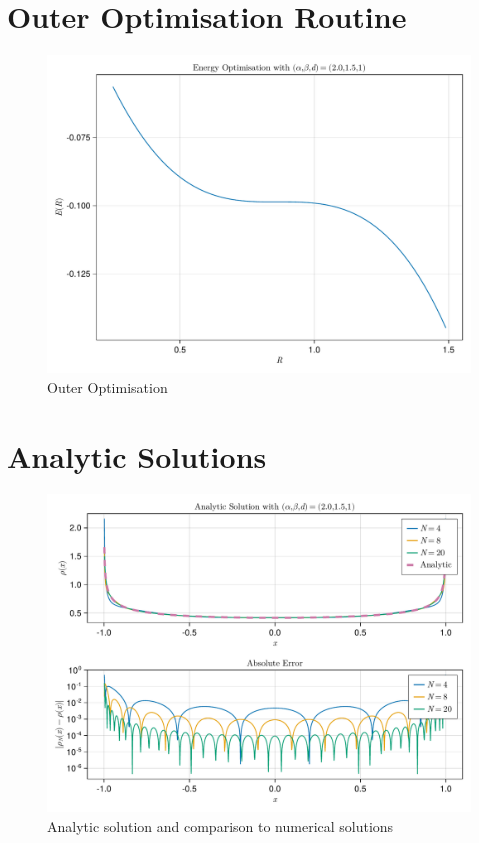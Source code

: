 \section{Outer Optimisation Routine}

\begin{figure}[H]
  \centering
  \label{fig:outer-optimisation}
  \includegraphics[width=0.8\linewidth]{../figures/results/outer-optimisation.pdf}
  \caption{Outer Optimisation}
\end{figure}

\section{Analytic Solutions}
\begin{figure}[H]
  \centering
  \label{fig:analytic-solution}
  \includegraphics[width=\linewidth]{../figures/results/analytic-solution.pdf}
  \caption{Analytic solution and comparison to numerical solutions}
\end{figure}

